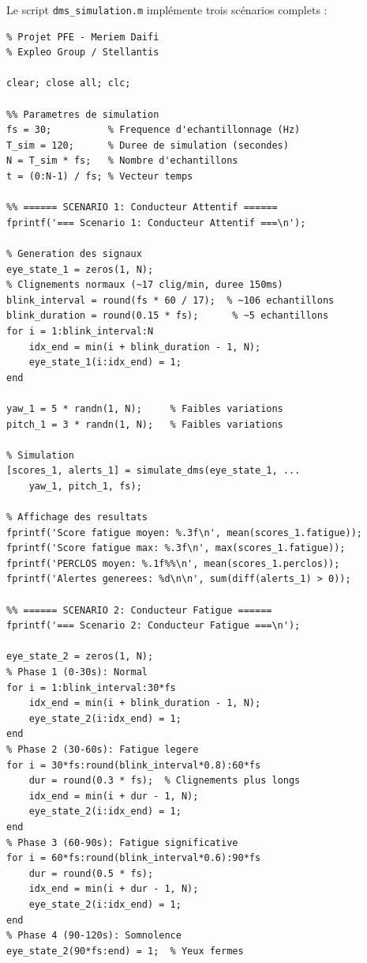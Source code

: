 Le script \texttt{dms\_simulation.m} implémente trois scénarios complets :

\begin{lstlisting}[style=matlabstyle, caption={Script principal de simulation DMS en MATLAB.}, label={lst:simulation_matlab}]
%% Simulation DMS - Script Principal
% Projet PFE - Meriem Daifi
% Expleo Group / Stellantis

clear; close all; clc;

%% Parametres de simulation
fs = 30;          % Frequence d'echantillonnage (Hz)
T_sim = 120;      % Duree de simulation (secondes)
N = T_sim * fs;   % Nombre d'echantillons
t = (0:N-1) / fs; % Vecteur temps

%% ====== SCENARIO 1: Conducteur Attentif ======
fprintf('=== Scenario 1: Conducteur Attentif ===\n');

% Generation des signaux
eye_state_1 = zeros(1, N);
% Clignements normaux (~17 clig/min, duree 150ms)
blink_interval = round(fs * 60 / 17);  % ~106 echantillons
blink_duration = round(0.15 * fs);      % ~5 echantillons
for i = 1:blink_interval:N
    idx_end = min(i + blink_duration - 1, N);
    eye_state_1(i:idx_end) = 1;
end

yaw_1 = 5 * randn(1, N);     % Faibles variations
pitch_1 = 3 * randn(1, N);   % Faibles variations

% Simulation
[scores_1, alerts_1] = simulate_dms(eye_state_1, ...
    yaw_1, pitch_1, fs);

% Affichage des resultats
fprintf('Score fatigue moyen: %.3f\n', mean(scores_1.fatigue));
fprintf('Score fatigue max: %.3f\n', max(scores_1.fatigue));
fprintf('PERCLOS moyen: %.1f%%\n', mean(scores_1.perclos));
fprintf('Alertes generees: %d\n\n', sum(diff(alerts_1) > 0));

%% ====== SCENARIO 2: Conducteur Fatigue ======
fprintf('=== Scenario 2: Conducteur Fatigue ===\n');

eye_state_2 = zeros(1, N);
% Phase 1 (0-30s): Normal
for i = 1:blink_interval:30*fs
    idx_end = min(i + blink_duration - 1, N);
    eye_state_2(i:idx_end) = 1;
end
% Phase 2 (30-60s): Fatigue legere
for i = 30*fs:round(blink_interval*0.8):60*fs
    dur = round(0.3 * fs);  % Clignements plus longs
    idx_end = min(i + dur - 1, N);
    eye_state_2(i:idx_end) = 1;
end
% Phase 3 (60-90s): Fatigue significative
for i = 60*fs:round(blink_interval*0.6):90*fs
    dur = round(0.5 * fs);
    idx_end = min(i + dur - 1, N);
    eye_state_2(i:idx_end) = 1;
end
% Phase 4 (90-120s): Somnolence
eye_state_2(90*fs:end) = 1;  % Yeux fermes


\end{lstlisting}
